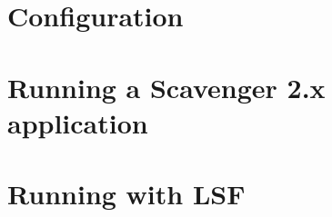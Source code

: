 \documentclass{scrbook}
\begin{document}
\section{Configuration}
\section{Running a Scavenger 2.x application}
\section{Running with LSF}
\end{document}
